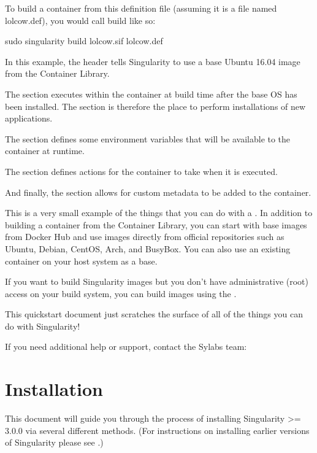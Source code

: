 \documentclass[letterpaper,10pt,english]{sphinxmanual}
\begin{document}
To build a container from this definition file (assuming it is a file
named lolcow.def), you would call build like so:

%
\begin{sphinxVerbatim}[commandchars=\\\{\}]
\PYGZdl{} sudo singularity build lolcow.sif lolcow.def
\end{sphinxVerbatim}

In this example, the header tells Singularity to use a base Ubuntu 16.04 image
from the Container Library.

The  section executes within the container at build time after the base
OS has been installed. The  section is therefore the place to perform
installations of new applications.

The  section defines some environment variables that will be
available to the container at runtime.

The  section defines actions for the container to take when it is
executed.

And finally, the  section allows for custom metadata to be added to
the container.

This is a very small example of the things that you can do with a .
In addition to building a container from the Container Library, you can start
with base images from Docker Hub and use images directly from official
repositories such as Ubuntu, Debian, CentOS, Arch, and BusyBox.  You can also
use an existing container on your host system as a base.

If you want to build Singularity images but you don’t have administrative (root)
access on your build system, you can build images using the .

This quickstart document just scratches the surface of all of the things you can
do with Singularity!

If you need additional help or support, contact the Sylabs team:


\chapter{Installation}
\label{\detokenize{installation:installation}}\label{\detokenize{installation:id1}}\label{\detokenize{installation::doc}}\label{\detokenize{installation:sec-installation}}
This document will guide you through the process of installing Singularity \textgreater{}=
3.0.0 via several different methods. (For instructions on installing earlier
versions of Singularity please see .)
\end{document}
